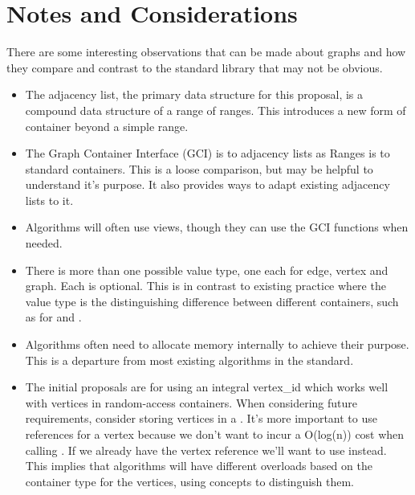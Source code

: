\section{Notes and Considerations}
There are some interesting observations that can be made about graphs and how they compare and contrast to the 
standard library that may not be obvious.
\begin{itemize}
    \item The adjacency list, the primary data structure for this proposal, is a compound data structure of a
          range of ranges. This introduces a new form of container beyond a simple range.
    \item The Graph Container Interface (GCI) is to adjacency lists as Ranges is to standard containers. This is a loose comparison,
          but may be helpful to understand it's purpose. It also provides ways to adapt existing adjacency lists
          to it. 
    \item Algorithms will often use views, though they can use the GCI functions when needed.
    \item There is more than one possible value type, one each for edge, vertex and graph. Each is optional.
          This is in contrast to existing practice where the value type is the distinguishing difference between
          different containers, such as for  and .
    \item Algorithms often need to allocate memory internally to achieve their purpose. This is a departure from most
          existing algorithms in the standard.
    \item The initial proposals are for using an integral vertex\_id which works well with vertices in random-access 
          containers. When considering future requirements, consider storing vertices in a . It's more
          important to use references for a vertex because we don't want to incur a O(log(n)) cost when calling 
          . If we already have the vertex reference we'll want to use  instead. 
          This implies that algorithms will have different overloads based on the container type for 
          the vertices, using concepts to distinguish them.
\end{itemize}
